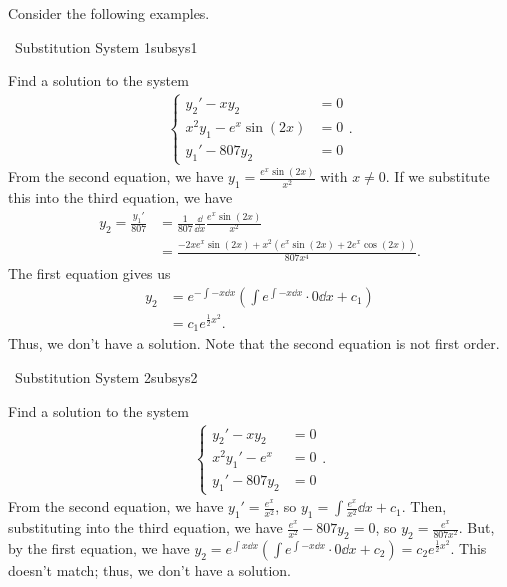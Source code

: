     \vphantom
    \\
    \\
    Consider the following examples.
    \begin{example}{\Difficulty\,\Difficulty\,\,Substitution System 1}{subsys1}
        
        Find a solution to the system
        \begin{align*}
            \begin{cases}
                y_2'-xy_2&=0 \\
                x^2y_1-e^x\sin(2x)&=0 \\
                y_1'-807y_2&=0
            \end{cases}.
        \end{align*}
        From the second equation, we have \(y_1=\frac{e^x\sin(2x)}{x^2}\) with \(x\neq 0\). If we substitute this into the third equation, we have
        \begin{align*}
            y_2=\frac{y_1'}{807}&=\frac{1}{807}\frac{\dd}{\dd x}\frac{e^x\sin(2x)}{x^2} \\
            &=\frac{-2xe^x\sin(2x)+x^2(e^x\sin(2x)+2e^x\cos(2x))}{807x^4}.
        \end{align*}
        The first equation gives us
        \begin{align*}
            y_2&=e^{-\int -x\dd x}\left(\int e^{\int -x\dd x}\cdot 0\dd x+c_1\right) \\
            &=c_1e^{\frac{1}{2}x^2}.
        \end{align*}
        Thus, we don't have a solution. Note that the second equation is not first order.

    \end{example}
    \pagebreak
    \begin{example}{\Difficulty\,\Difficulty\,\,Substitution System 2}{subsys2}
        
        Find a solution to the system
        \begin{align*}
            \begin{cases}
                y_2'-xy_2&=0 \\
                x^2y_1'-e^x&=0 \\
                y_1'-807y_2&=0
            \end{cases}.
        \end{align*}
        From the second equation, we have \(y_1'=\frac{e^x}{x^2}\), so \(y_1=\int \frac{e^x}{x^2}\dd x+c_1\). Then, substituting into the third equation, we have \(\frac{e^x}{x^2}-807y_2=0\), so \(y_2=\frac{e^x}{807x^2}\). But, by the first equation, we have \(y_2=e^{\int x \dd x}\left(\int e^{\int -x\dd x}\cdot 0\dd x+c_2\right)=c_2e^{\frac{1}{2}x^2}\). This doesn't match; thus, we don't have a solution.

    \end{example}
